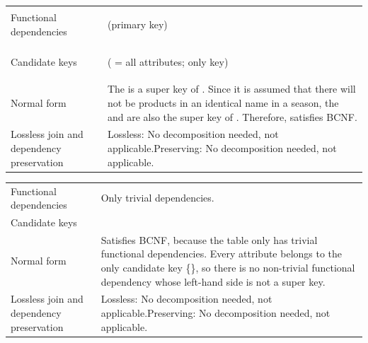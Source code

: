 \begin{xltabular}{\linewidth}{@{}KY@{}}
Functional dependencies & \begin{points}
  \item {} (primary key)
  \item {}
\end{points} \\
Candidate keys & \begin{points}
  \item {} ( = all attributes; only key)
  \item {}
\end{points} \\
Normal form & The  is a super key of . Since it is assumed that there will not be products in an identical name in a season, the  and  are also the super key of . Therefore,  satisfies BCNF. \\
Lossless join and dependency preservation & Lossless: No decomposition needed, not applicable.\newline Preserving: No decomposition needed, not applicable. \\
\bottomrule
\end{xltabular}

\begin{xltabular}{\linewidth}{@{}KY@{}}
Functional dependencies & Only trivial dependencies. \\
Candidate keys & \begin{points}
  \item {}
\end{points} \\
Normal form & Satisfies BCNF, because the table only has trivial functional dependencies. Every attribute belongs to the only candidate key \{\}, so there is no non-trivial functional dependency whose left-hand side is not a super key. \\
Lossless join and dependency preservation & Lossless: No decomposition needed, not applicable.\newline Preserving: No decomposition needed, not applicable. \\
\bottomrule
\end{xltabular}

